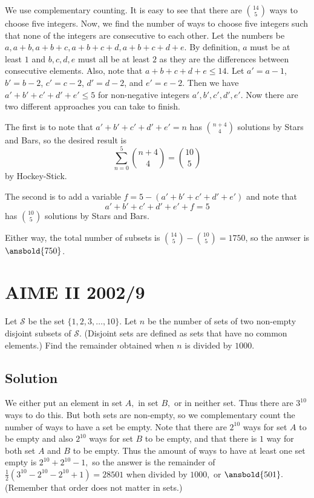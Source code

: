 \documentclass{article}
\begin{document}
We use complementary counting. It is easy to see that there are $\binom{14}{5}$ ways to choose five integers. Now, we find the number of ways to choose five integers such that none of the integers are consecutive to each other. Let the numbers be $a,a+b,a+b+c,a+b+c+d,a+b+c+d+e.$ By definition, $a$ must be at least $1$ and $b,c,d,e$ must all be at least $2$ as they are the differences between consecutive elements. Also, note that $a+b+c+d+e\leq 14.$ Let $a'=a-1$, $b'=b-2$, $c'=c-2$, $d'=d-2$, and $e'=e-2$. Then we have $a'+b'+c'+d'+e'\leq 5$ for non-negative integers $a',b',c',d',e'$. Now there are two different approaches you can take to finish.

The first is to note that $a'+b'+c'+d'+e'=n$ has $\binom{n+4}{4}$ solutions by Stars and Bars, so the desired result is
\[\sum\limits_{n=0}^5 \binom{n+4}{4}=\binom{10}{5}\]
by Hockey-Stick.

The second is to add a variable $f=5-(a'+b'+c'+d'+e')$ and note that
\[a'+b'+c'+d'+e'+f=5\]
has $\binom{10}{5}$ solutions by Stars and Bars.

Either way, the total number of subsets is $\binom{14}{5}-\binom{10}{5}=1750$, so the anwser is $\ansbold{750}$.

\pagebreak\section{AIME II 2002/9}
Let $\mathcal{S}$ be the set $\lbrace1,2,3,\ldots,10\rbrace.$ Let $n$ be the number of sets of two non-empty disjoint subsets of $\mathcal{S}$. (Disjoint sets are defined as sets that have no common elements.) Find the remainder obtained when $n$ is divided by $1000$.

\subsection{Solution}
We either put an element in set $A,$ in set $B,$ or in neither set. Thus there are $3^{10}$ ways to do this. But both sets are non-empty, so we complementary count the number of ways to have a set be empty. Note that there are $2^{10}$ ways for set $A$ to be empty and also $2^{10}$ ways for set $B$ to be empty, and that there is $1$ way for both set $A$ and $B$ to be empty. Thus the amount of ways to have at least one set empty is $2^{10}+2^{10}-1,$ so the answer is the remainder of $\frac{1}{2}(3^{10}-2^{10}-2^{10}+1)=28501$ when divided by $1000,$ or $\ansbold{501}.$ (Remember that order does not matter in sets.)
\end{document}

